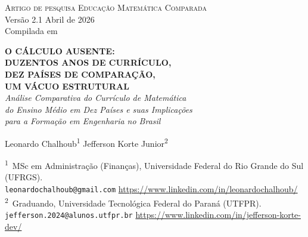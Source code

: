 \documentclass[12pt,a4paper,oneside]{article}
\begin{document}
\begin{titlepage}
  \begin{center}
    \vspace*{1.5cm}
    {\small\textsc{Artigo de pesquisa \quad\textbar\quad Educação Matemática Comparada}}\\
    {\small Versão 2.1 \textemdash{} Abril de 2026}\\[2pt]
    {\footnotesize Compilada em \COMPILESTAMP\ \textbullet\ \texttt{\COMPILESHA}}

    \vfill

    {\LARGE\bfseries
     O CÁLCULO AUSENTE:\\[6pt]
     DUZENTOS ANOS DE CURRÍCULO,\\
     DEZ PAÍSES DE COMPARAÇÃO,\\
     UM VÁCUO ESTRUTURAL}\\[18pt]

    {\large
      \textit{Análise Comparativa do Currículo de Matemática\\
      do Ensino Médio em Dez Países e suas Implicações\\
      para a Formação em Engenharia no Brasil}}

    \vfill

    {\large Leonardo Chalhoub\textsuperscript{1} \quad\textbullet\quad Jefferson Korte Junior\textsuperscript{2}}\\[10pt]
    \begin{minipage}{0.88\textwidth}\centering\footnotesize
      \textsuperscript{1}~MSc em Administração (Finanças), Universidade Federal do Rio Grande do Sul (UFRGS).\\
      \texttt{leonardochalhoub@gmail.com} \textbullet{} \url{https://www.linkedin.com/in/leonardochalhoub/}\\[4pt]
      \textsuperscript{2}~Graduando, Universidade Tecnológica Federal do Paraná (UTFPR).\\
      \texttt{jefferson.2024@alunos.utfpr.br} \textbullet{} \url{https://www.linkedin.com/in/jefferson-korte-dev/}
    \end{minipage}

    \vfill


\end{center}
\end{titlepage}
\end{document}
